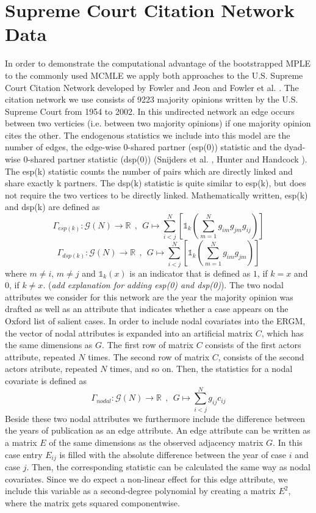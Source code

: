 \documentclass[headsepline=true, abstracton]{scrartcl}
\begin{document}
\section*{Supreme Court Citation Network Data}

In order to demonstrate the computational advantage of the bootstrapped MPLE to the commonly used MCMLE we apply both approaches to the U.S. Supreme Court Citation Network developed by Fowler and Jeon \cite{FowlerJeon2008} and Fowler et al. \cite{Fowleretal2007}. The citation network we use consists of 9223 majority opinions written by the U.S. Supreme Court from 1954 to 2002. In this undirected network an edge occurs between two verticies (i.e. between two majority opinions) if one majority opinion cites the other. The endogenous statistics we include into this model are the number of edges, the edge-wise 0-shared partner (esp(0)) statistic and the dyad-wise 0-shared partner statistic (dsp(0)) (Snijders et al. \cite{SnijdersTomA.B..2006}, Hunter and Handcock \cite{Hunter.2006}). The esp(k) statistic counts the number of pairs which are directly linked and share exactly k partners. The dsp(k) statistic is quite similar to esp(k), but does not require the two vertices to be directly linked. Mathematically written, esp(k) and dsp(k) are defined as 
$$\Gamma_{esp(k)}: \mathcal{G}(N) \to \mathbb{R}~~,~~G \mapsto \sum_{i<j}^{N} \left[\mathds{1}_{k} \left(\sum_{m=1}^{N} g_{im}g_{jm}g_{ij} \right)\right]$$
$$\Gamma_{dsp(k)}: \mathcal{G}(N) \to \mathbb{R}~~,~~G \mapsto \sum_{i<j}^{N} \left[\mathds{1}_{k} \left(\sum_{m=1}^{N} g_{im}g_{jm} \right)\right]$$
where $m\neq i$, $m \neq j$ and $\mathds{1}_k(x)$ is an indicator that is defined as $1$, if $k=x$ and $0$, if $k\neq x$.
({\it add explanation for adding esp(0) and dsp(0)}). 
The two nodal attributes we consider for this network are the year the majority opinion was drafted as well as an attribute that indicates whether a case appears on the Oxford list of salient cases. In order to include nodal covariates into the ERGM, the vector of nodal attributes is expanded into an artificial matrix $C$, which has the same dimensions as $G$. The first row of matrix $C$ consists of the first actors attribute, repeated $N$ times. The second row of matrix $C$, consists of the second actors atribute, repeated $N$ times, and so on. Then, the statistics for a nodal covariate is defined as
$$\Gamma_{nodal}: \mathcal{G}(N) \to \mathbb{R}~~,~~G \mapsto \sum_{i<j}^{N}g_{ij}c_{ij}$$
Beside these two nodal attributes we furthermore include the difference between the years of publication as an edge attribute. An edge attribute can be written as a matrix $E$ of the same dimensions as the observed adjacency matrix $G$. In this case entry $E_{ij}$ is filled with the absolute difference between the year of case $i$ and case $j$. Then, the corresponding statistic can be calculated the same way as nodal covariates. Since we do expect a non-linear effect for this edge attribute, we include this variable as a second-degree polynomial by creating a matrix $E^2$, where the matrix gets squared componentwise.\\[0.3cm]
\end{document}
